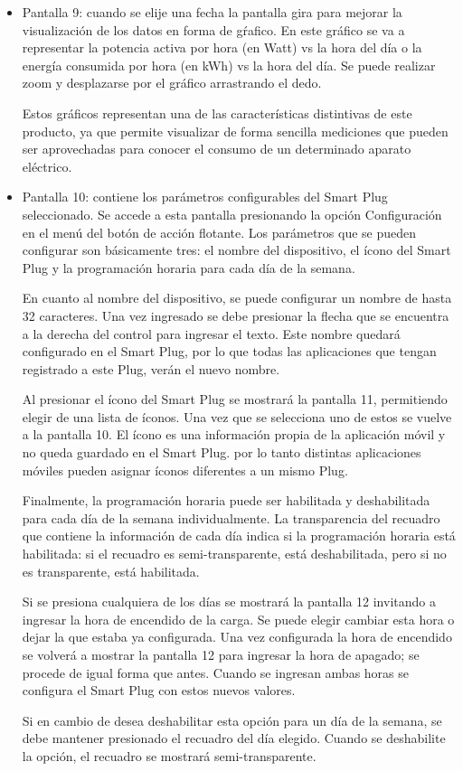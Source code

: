 \begin{itemize}
\item Pantalla 9: cuando se elije una fecha la pantalla gira para mejorar la visualización de los datos en forma de gŕafico. En este gráfico se va a representar la potencia activa por hora (en Watt) vs la hora del día o la energía consumida por hora (en kWh) vs la hora del día. Se puede realizar zoom y desplazarse por el gráfico arrastrando el dedo.

Estos gráficos representan una de las características distintivas de este producto, ya que permite visualizar de forma sencilla mediciones que pueden ser aprovechadas para conocer el consumo de un determinado aparato eléctrico.

\item Pantalla 10: contiene los parámetros configurables del Smart Plug seleccionado. Se accede a esta pantalla presionando la opción Configuración en el menú del botón de acción flotante. Los parámetros que se pueden configurar son básicamente tres: el nombre del dispositivo, el ícono del Smart Plug y la programación horaria para cada día de la semana.

En cuanto al nombre del dispositivo, se puede configurar un nombre de hasta 32 caracteres. Una vez ingresado se debe presionar la flecha que se encuentra a la derecha del control para ingresar el texto. Este nombre quedará configurado en el Smart Plug, por lo que todas las aplicaciones que tengan registrado a este Plug, verán el nuevo nombre.

Al presionar el ícono del Smart Plug se mostrará la pantalla 11, permitiendo elegir de una lista de íconos. Una vez que se selecciona uno de estos se vuelve a la pantalla 10. El ícono es una información propia de la aplicación móvil y no queda guardado en el Smart Plug. por lo tanto distintas aplicaciones móviles pueden asignar íconos diferentes a un mismo Plug.

Finalmente, la programación horaria puede ser habilitada y deshabilitada para cada día de la semana individualmente. La transparencia del recuadro que contiene la información de cada día indica si la programación horaria está habilitada: si el recuadro es semi-transparente, está deshabilitada, pero si no es transparente, está habilitada. 

Si se presiona cualquiera de los días se mostrará la pantalla 12 invitando a ingresar la hora de encendido de la carga. Se puede elegir cambiar esta hora o dejar la que estaba ya configurada. Una vez configurada la hora de encendido se volverá a mostrar la pantalla 12 para ingresar la hora de apagado; se procede de igual forma que antes. Cuando se ingresan ambas horas se configura el Smart Plug con estos nuevos valores.

Si en cambio de desea deshabilitar esta opción para un día de la semana, se debe mantener presionado el recuadro del día elegido. Cuando se deshabilite la opción, el recuadro se mostrará semi-transparente.

\end{itemize}


